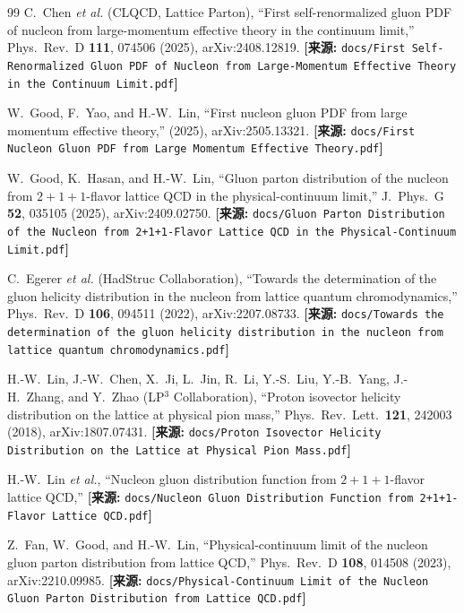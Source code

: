 \documentclass[12pt,a4paper]{ctexart}
\theoremstyle{definition}
\begin{document}
\begin{thebibliography}{99}
C.~Chen \textit{et al.} (CLQCD, Lattice Parton),
``First self-renormalized gluon PDF of nucleon from large-momentum effective theory in the continuum limit,''
Phys.\ Rev.\ D \textbf{111}, 074506 (2025), arXiv:2408.12819.
\quad\textbf{[来源:} \texttt{docs/First Self-Renormalized Gluon PDF of Nucleon from Large-Momentum Effective Theory in the Continuum Limit.pdf}\textbf{]}

W.~Good, F.~Yao, and H.-W.~Lin,
``First nucleon gluon PDF from large momentum effective theory,''
(2025), arXiv:2505.13321.
\quad\textbf{[来源:} \texttt{docs/First Nucleon Gluon PDF from Large Momentum Effective Theory.pdf}\textbf{]}

W.~Good, K.~Hasan, and H.-W.~Lin,
``Gluon parton distribution of the nucleon from $2+1+1$-flavor lattice QCD in the physical-continuum limit,''
J.\ Phys.\ G \textbf{52}, 035105 (2025), arXiv:2409.02750.
\quad\textbf{[来源:} \texttt{docs/Gluon Parton Distribution of the Nucleon from 2+1+1-Flavor Lattice QCD in the Physical-Continuum Limit.pdf}\textbf{]}


C.~Egerer \textit{et al.} (HadStruc Collaboration),
``Towards the determination of the gluon helicity distribution in the nucleon from lattice quantum chromodynamics,''
Phys.\ Rev.\ D \textbf{106}, 094511 (2022), arXiv:2207.08733.
\quad\textbf{[来源:} \texttt{docs/Towards the determination of the gluon helicity distribution in the nucleon from lattice quantum chromodynamics.pdf}\textbf{]}


H.-W.~Lin, J.-W.~Chen, X.~Ji, L.~Jin, R.~Li, Y.-S.~Liu, Y.-B.~Yang, J.-H.~Zhang, and Y.~Zhao (LP$^3$ Collaboration),
``Proton isovector helicity distribution on the lattice at physical pion mass,''
Phys.\ Rev.\ Lett.\ \textbf{121}, 242003 (2018), arXiv:1807.07431.
\quad\textbf{[来源:} \texttt{docs/Proton Isovector Helicity Distribution on the Lattice at Physical Pion Mass.pdf}\textbf{]}

H.-W.~Lin \textit{et al.},
``Nucleon gluon distribution function from $2+1+1$-flavor lattice QCD,''
\quad\textbf{[来源:} \texttt{docs/Nucleon Gluon Distribution Function from 2+1+1-Flavor Lattice QCD.pdf}\textbf{]}

Z.~Fan, W.~Good, and H.-W.~Lin,
``Physical-continuum limit of the nucleon gluon parton distribution from lattice QCD,''
Phys.\ Rev.\ D \textbf{108}, 014508 (2023), arXiv:2210.09985.
\quad\textbf{[来源:} \texttt{docs/Physical-Continuum Limit of the Nucleon Gluon Parton Distribution from Lattice QCD.pdf}\textbf{]}


\end{thebibliography}
\end{document}

